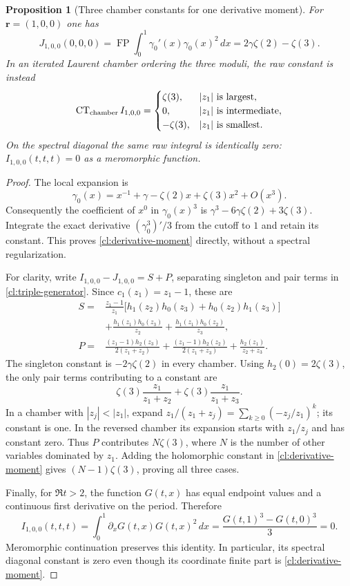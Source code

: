 \documentclass[11pt,a4paper]{article}
\numberwithin{equation}{section}
\newtheorem{proposition}[theorem]{Proposition}
\theoremstyle{definition}
\theoremstyle{remark}
\begin{document}
\begin{proposition}[Three chamber constants for one derivative moment]
\label{cl:chambers}
For $\boldsymbol r=(1,0,0)$ one has
\begin{equation}\label{cl:derivative-moment}
 J_{1,0,0}(0,0,0)
 =\operatorname{FP}\int_0^1\gamma_0'(x)\gamma_0(x)^2\,dx
 =2\gamma\zeta(2)-\zeta(3).
\end{equation}
In an iterated Laurent
chamber ordering the three moduli, the raw constant is instead
\begin{equation}\label{cl:chamber-values}
 \operatorname{CT}_{\rm chamber}I_{1,0,0}
 =\begin{cases}
 \zeta(3),& |z_1|\text{ is largest},\\
 0,& |z_1|\text{ is intermediate},\\
 -\zeta(3),& |z_1|\text{ is smallest}.
 \end{cases}
\end{equation}
On the spectral diagonal the same raw integral is identically zero:
$I_{1,0,0}(t,t,t)=0$ as a meromorphic function.
\end{proposition}
\begin{proof}
The local expansion is
\[
 \gamma_0(x)=x^{-1}+\gamma-\zeta(2)x+\zeta(3)x^2+O(x^3).
\]
Consequently the coefficient of $x^0$ in $\gamma_0(x)^3$ is
$\gamma^3-6\gamma\zeta(2)+3\zeta(3)$. Integrate the exact derivative
$(\gamma_0^3)'/3$ from the cutoff to $1$ and retain its constant.
This proves \eqref{cl:derivative-moment} directly, without a spectral
regularization.

For clarity, write $I_{1,0,0}-J_{1,0,0}=S+P$, separating singleton
and pair terms in \eqref{cl:triple-generator}. Since $c_1(z_1)=z_1-1$,
these are
\begin{align*}
 S={}&\frac{z_1-1}{z_1}
       \bigl[h_1(z_2)h_0(z_3)+h_0(z_2)h_1(z_3)\bigr]\\
   &+\frac{h_1(z_1)h_0(z_3)}{z_2}
     +\frac{h_1(z_1)h_0(z_2)}{z_3},\\
 P={}&\frac{(z_1-1)h_2(z_3)}{2(z_1+z_2)}
     +\frac{(z_1-1)h_2(z_2)}{2(z_1+z_3)}
     +\frac{h_2(z_1)}{z_2+z_3}.
\end{align*}
The singleton constant is $-2\gamma\zeta(2)$ in every chamber.
Using $h_2(0)=2\zeta(3)$, the only pair terms contributing to a
constant are
\[
 \zeta(3)\frac{z_1}{z_1+z_2}
       +\zeta(3)\frac{z_1}{z_1+z_3}.
\]
In a chamber with $|z_j|<|z_1|$, expand
$z_1/(z_1+z_j)=\sum_{k\ge0}(-z_j/z_1)^k$; its constant is one.
In the reversed chamber its expansion starts with $z_1/z_j$ and
has constant zero. Thus $P$ contributes $N\zeta(3)$, where
$N$ is the number of other variables dominated by $z_1$.
Adding the holomorphic constant in \eqref{cl:derivative-moment} gives
$(N-1)\zeta(3)$, proving all three cases.

Finally, for $\Re t>2$, the function $G(t,x)$ has equal endpoint
values and a continuous first derivative on the period. Therefore
\[
 I_{1,0,0}(t,t,t)=\int_0^1
       \partial_xG(t,x)G(t,x)^2\,dx
       =\frac{G(t,1)^3-G(t,0)^3}{3}=0.
\]
Meromorphic continuation preserves this identity. In particular,
its spectral diagonal constant is zero even though its coordinate
finite part is \eqref{cl:derivative-moment}.
\end{proof}
\end{document}
